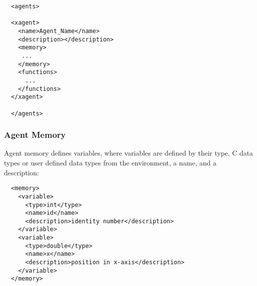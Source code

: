 \begin{verbatim}
  <agents>

  <xagent>
    <name>Agent_Name</name>
    <description></description>
    <memory>
     ...
    </memory>
    <functions>
      ...
    </functions>
  </xagent>
  
  </agents>
\end{verbatim}
% 


\subsubsection{Agent Memory}

Agent memory defines variables, where variables are defined by their type, C
data types or user defined data types from the environment, a name, and a
description:

\begin{verbatim}
  <memory>
    <variable>
      <type>int</type>
      <name>id</name>
      <description>identity number</description>
    </variable>
    <variable>
      <type>double</type>
      <name>x</name>
      <description>position in x-axis</description>
    </variable>
  </memory>
\end{verbatim}


